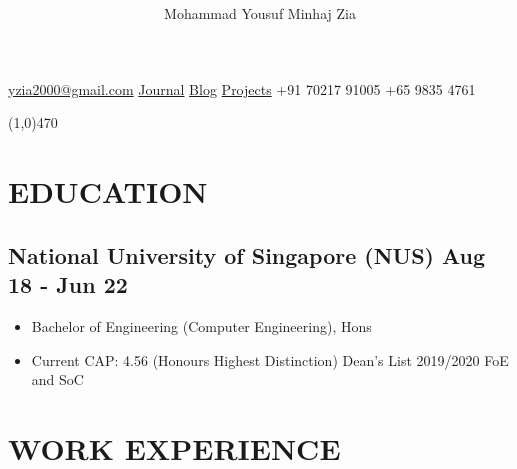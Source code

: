 \documentclass[9pts]{article}
\date{\vspace{-5ex}}
\title{\vspace{-5ex} \vspace{-5ex}}
\author{\Huge Mohammad Yousuf Minhaj Zia}
\begin{document}
\maketitle

\centerline{
\href{mailto:yzia2000@gmail.com}{yzia2000@gmail.com} \textbar \hspace{1pt} 
\href{https://journal-mauve.vercel.app/}{Journal} \textbar \hspace{1pt} 
\href{https://yzia2000.github.io/blog}{Blog} \textbar \hspace{1pt} 
\href{https://github.com/yzia2000}{\faGithub \hspace{1pt} Projects} \textbar \hspace{1pt}
\href{https://www.linkedin.com/in/mohammad-yousuf-minhaj-zia-ab555396}{\faLinkedin} \textbar \hspace{1pt}
+91 70217 91005 \textbar \hspace{1pt} 
+65 9835 4761 
}

\line(1,0){470}\\

\section*{EDUCATION}
\subsection*{National University of Singapore (NUS) \hfill Aug 18 - Jun 22}
\begin{itemize}
    \item Bachelor of Engineering (Computer Engineering), Hons
    \item Current CAP: 4.56 (Honours Highest Distinction) Dean's List 2019/2020 FoE and SoC
\end{itemize}

\section*{WORK EXPERIENCE}
\end{document}
